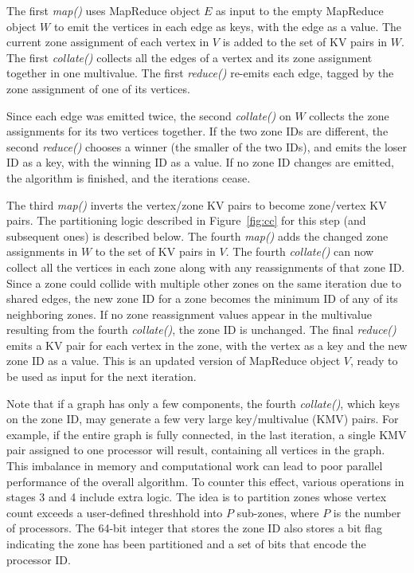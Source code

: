 The first {\it map()} uses MapReduce object $E$ as input to the empty
MapReduce object $W$ to emit the vertices in each edge as keys, with
the edge as a value.  The current zone assignment of each vertex in
$V$ is added to the set of KV pairs in $W$.  The first {\it collate()}
collects all the edges of a vertex and its zone assignment together in
one multivalue.  The first {\it reduce()} re-emits each edge, tagged
by the zone assignment of one of its vertices.

Since each edge was emitted twice, the second {\it collate()} on $W$
collects the zone assignments for its two vertices together.  If the
two zone IDs are different, the second {\it reduce()} chooses a winner
(the smaller of the two IDs), and emits the loser ID as a key, with
the winning ID as a value.  If no zone ID changes are emitted, the
algorithm is finished, and the iterations cease.

The third {\it map()} inverts the vertex/zone KV pairs to become
zone/vertex KV pairs.  The partitioning logic described in
Figure~\ref{fig:cc} for this step (and subsequent ones) is described
below.  The fourth {\it map()} adds the changed zone assignments in
$W$ to the set of KV pairs in $V$.  The fourth {\it collate()} can now
collect all the vertices in each zone along with any reassignments of
that zone ID.  Since a zone could collide with multiple other zones on
the same iteration due to shared edges, the new zone ID for a zone
becomes the minimum ID of any of its neighboring zones.  If no zone
reassignment values appear in the multivalue resulting from the fourth
{\it collate()}, the zone ID is unchanged.  The final {\it reduce()}
emits a KV pair for each vertex in the zone, with the vertex as a key
and the new zone ID as a value.  This is an updated version of
MapReduce object $V$, ready to be used as input for the next
iteration.

Note that if a graph has only a few components, the fourth {\it
collate()}, which keys on the zone ID, may generate a few very large
key/multivalue (KMV) pairs.  For example, if the entire graph is fully
connected, in the last iteration, a single KMV pair assigned to one
processor will result, containing all vertices in the graph.  This
imbalance in memory and computational work can lead to poor parallel
performance of the overall algorithm.  To counter this effect, various
operations in stages 3 and 4 include extra logic.  The idea is to
partition zones whose vertex count exceeds a user-defined threshhold
into $P$ sub-zones, where $P$ is the number of processors.  The 64-bit
integer that stores the zone ID also stores a bit flag indicating the
zone has been partitioned and a set of bits that encode the processor
ID.

